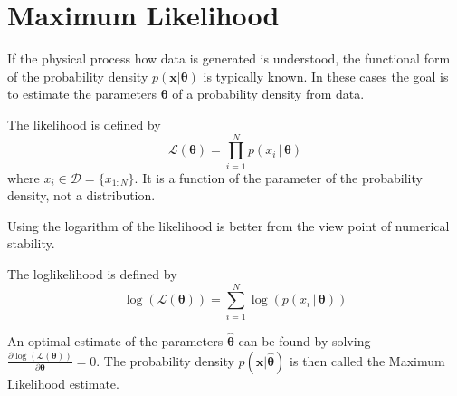 \documentclass{tstextbook}
\begin{document}
 
\section{Maximum Likelihood}
If the physical process how data is generated is understood, the functional form of the probability density $p(\mathbf{x}\vert \boldsymbol{\theta})$ is typically known. In these cases the goal is to estimate the parameters $\boldsymbol{\theta}$ of a probability density from data.

\begin{definition}[Likelihood]
  \label{th:likelihood}
  The likelihood is defined by
  \begin{equation}
    \mathcal{L}(\boldsymbol{\theta}) = \prod_{i=1}^N p\left(x_i\,\vert\, \boldsymbol{\theta}\right)
  \end{equation}
where $x_i \in \mathcal{D}=\{x_{1:N}\}$. It is a function of the parameter of the probability density, not a distribution.
\end{definition}
Using the logarithm of the likelihood is better from the view point of numerical stability. 
\begin{definition}[Loglikelihood]
  \label{th:loglikelihood}
  The loglikelihood is defined by
  \begin{equation}
    \log(\mathcal{L}(\boldsymbol{\theta})) = \sum_{i=1}^N \log\left(p\left(x_i\,\vert\, \boldsymbol{\theta}\right)\right)
  \end{equation}
\end{definition}
An optimal estimate of the parameters $\boldsymbol{\hat{\theta}}$ can be found by solving 
$\frac{ \partial\log\left(\mathcal{L}(\boldsymbol{\theta})\right)}{\partial\boldsymbol{\theta}}=0$. The probability density $p(\mathbf{x}\vert \boldsymbol{\hat{\theta}})$ is then called the Maximum Likelihood estimate. 
\end{document}
